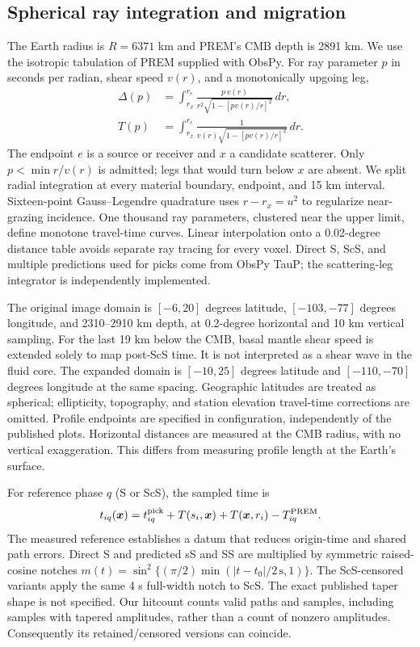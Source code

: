 \subsection{Spherical ray integration and migration}
The Earth radius is $R=6371$ km and PREM's CMB depth is 2891 km. We use the
isotropic tabulation of PREM supplied with ObsPy. For ray parameter $p$ in
seconds per radian, shear speed $v(r)$, and a monotonically upgoing leg,
\begin{align}
 \Delta(p)&=\int_{r_x}^{r_e}
 \frac{p\,v(r)}{r^2\sqrt{1-[p v(r)/r]^2}}\,dr,\\
 T(p)&=\int_{r_x}^{r_e}
 \frac{1}{v(r)\sqrt{1-[p v(r)/r]^2}}\,dr.
\end{align}
The endpoint $e$ is a source or receiver and $x$ a candidate scatterer.
Only $p<\min r/v(r)$ is admitted; legs that would turn below $x$ are absent.
We split radial integration at every material boundary, endpoint, and 15 km
interval. Sixteen-point Gauss--Legendre quadrature uses $r-r_x=u^2$ to regularize
near-grazing incidence. One thousand ray parameters, clustered near the upper
limit, define monotone travel-time curves. Linear interpolation onto a
0.02-degree distance table avoids separate ray tracing for every voxel.
Direct S, ScS, and multiple predictions used for picks come from ObsPy TauP;
the scattering-leg integrator is independently implemented.

The original image domain is $[-6,20]$ degrees latitude, $[-103,-77]$ degrees
longitude, and 2310--2910 km depth, at 0.2-degree horizontal and 10 km vertical
sampling. For the last 19 km below the CMB, basal mantle shear speed is extended
solely to map post-ScS time. It is not interpreted as a shear wave in the fluid
core. The expanded domain is $[-10,25]$ degrees latitude and $[-110,-70]$ degrees
longitude at the same spacing. Geographic latitudes are treated as spherical;
ellipticity, topography, and station elevation travel-time corrections are omitted.
Profile endpoints are specified in configuration, independently of the published
plots. Horizontal distances are measured at the CMB radius, with no vertical
exaggeration. This differs from measuring profile length at the Earth's surface.

For reference phase $q$ (S or ScS), the sampled time is
\begin{equation}
 t_{iq}(\boldsymbol{x})=t^{\rm pick}_{iq}+
 T(s_i,\boldsymbol{x})+T(\boldsymbol{x},r_i)-T^{\rm PREM}_{iq}.
\end{equation}
The measured reference establishes a datum that reduces origin-time and shared
path errors. Direct S and predicted sS and SS are multiplied by symmetric
raised-cosine notches $m(t)=\sin^2\{(\pi/2)\min(|t-t_0|/2\,\mathrm{s},1)\}$.
The ScS-censored variants apply the same 4 s full-width notch to ScS. The exact
published taper shape is not specified. Our hitcount counts valid paths and
samples, including samples with tapered amplitudes, rather than a count of
nonzero amplitudes. Consequently its retained/censored versions can coincide.

